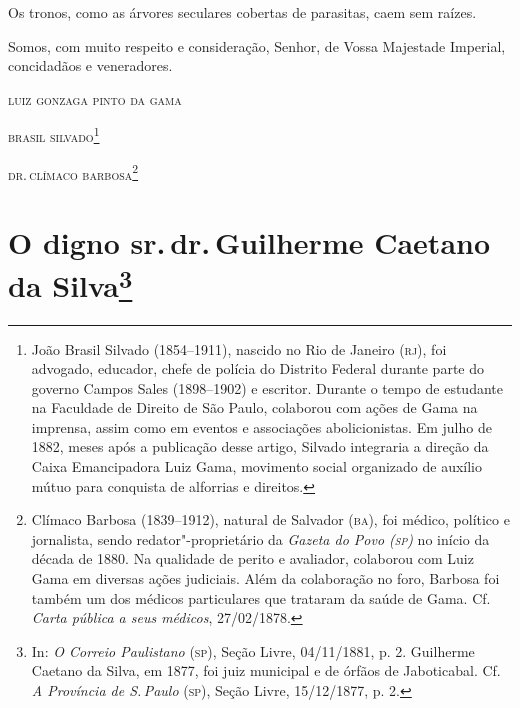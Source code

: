 Os tronos, como as árvores seculares cobertas de parasitas, caem sem
raízes.


Somos, com muito respeito e consideração, Senhor, de Vossa Majestade
Imperial, concidadãos e veneradores.

\hfill\textsc{luiz gonzaga pinto da gama}

\hfill\textsc{brasil silvado}\footnote{João Brasil Silvado (1854--1911), nascido no
  Rio de Janeiro (\textsc{rj}), foi advogado, educador, chefe de polícia do
  Distrito Federal durante parte do governo Campos Sales (1898--1902) e
  escritor. Durante o tempo de estudante na Faculdade de Direito de São
  Paulo, colaborou com ações de Gama na imprensa, assim como em eventos
  e associações abolicionistas. Em julho de 1882, meses após a
  publicação desse artigo, Silvado integraria a direção da Caixa
  Emancipadora Luiz Gama, movimento social organizado de auxílio mútuo
  para conquista de alforrias e direitos.}

\hfill\textsc{dr.\,clímaco barbosa}\footnote{Clímaco Barbosa (1839--1912), natural de
  Salvador (\textsc{ba}), foi médico, político e jornalista, sendo
  redator"-proprietário da \emph{Gazeta do Povo (\textsc{sp})} no início da década
  de 1880. Na qualidade de perito e avaliador, colaborou com Luiz Gama
  em diversas ações judiciais. Além da colaboração no foro, Barbosa foi
  também um dos médicos particulares que trataram da saúde de Gama. Cf.
  \emph{Carta pública a seus médicos}, 27/02/1878.}



\chapter{O digno sr.\,dr.\,Guilherme Caetano da Silva\footnote[*]{In:
  \emph{O Correio Paulistano} (\textsc{sp}), Seção Livre, 04/11/1881, p. 2.
  Guilherme Caetano da Silva, em 1877, foi juiz municipal e de órfãos de
  Jaboticabal. Cf. \emph{A Província de S.\,Paulo} (\textsc{sp}), Seção Livre,
  15/12/1877, p. 2.}}

